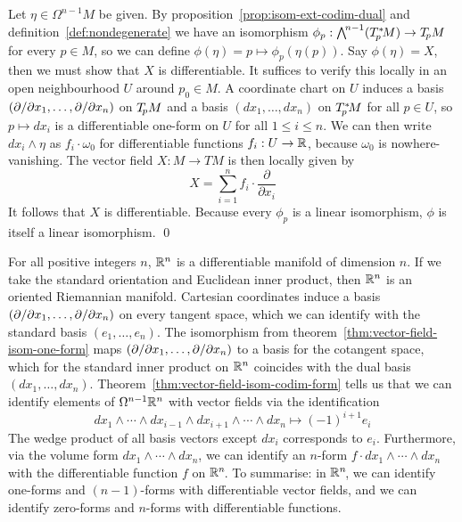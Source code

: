 \vspace{-\parskip}
\proof
Let $\eta \in \Omega^{n-1} M$ be given.
By proposition~\ref{prop:isom-ext-codim-dual}
and definition~\ref{def:nondegenerate}
we have an isomorphism $\phi_p : \L{n-1}(\Tps M) \to \Tp M$ for every $p \in M$,
so we can define $\phi(\eta) = p \mapsto \phi_p(\eta(p))$.
Say $\phi(\eta) = X$, then we must show that $X$ is differentiable.
It suffices to verify this locally in an open neighbourhood $U$ around $p_0 \in M$.
A coordinate chart on $U$ induces a basis $(\ppart x_1, \ldots, \ppart x_n)$ on $\Tp M$
and a basis $(dx_1, \ldots, dx_n)$ on $\Tps M$ for all $p \in U$,
so $p \mapsto dx_i$ is a differentiable one-form on $U$ for all $1 \leq i \leq n$.
We can then write $dx_i \wedge \eta$ as $f_i \cdot \omega_0$
for differentiable functions $f_i : U \to \R$,
because $\omega_0$ is nowhere-vanishing.
The vector field $X : M \to TM$ is then locally given by
\[ X = \sum_{i = 1}^n f_i \cdot \frac{\partial}{\partial x_i} \]
It follows that $X$ is differentiable.
Because every $\phi_p$ is a linear isomorphism,
$\phi$ is itself a linear isomorphism.
\qed

\example[ex:r3-manifold]
For all positive integers $n$,
$\R^n$ is a differentiable manifold of dimension $n$.
If we take the standard orientation and Euclidean inner product,
then $\R^n$ is an oriented Riemannian manifold.
Cartesian coordinates induce a basis
$(\ppart x_1, \ldots, \ppart x_n)$ on every tangent space,
which we can identify with the standard basis $(e_1, \ldots, e_n)$.
The isomorphism from theorem~\ref{thm:vector-field-isom-one-form}
maps $(\ppart x_1, \ldots, \ppart x_n)$ to a basis for the cotangent space,
which for the standard inner product on $\R^n$
coincides with the dual basis $(dx_1, \ldots, dx_n)$.
Theorem~\ref{thm:vector-field-isom-codim-form} tells us that we can identify
elements of $\Omega^{n-1} \R^n$ with vector fields via the identification
\[ dx_1 \wedge \cdots \wedge dx_{i - 1} \wedge dx_{i + 1} \wedge \cdots \wedge dx_n
\longmapsto (-1)^{i + 1} e_i \]
The wedge product of all basis vectors except $dx_i$ corresponds to $e_i$.
Furthermore, via the volume form $dx_1 \wedge \cdots \wedge dx_n$,
we can identify an $n$-form $f \cdot dx_1 \wedge \cdots \wedge dx_n$
with the differentiable function $f$ on $\R^n\!$.
To summarise:
in $\R^n\!$, we can identify one-forms and $(n-1)$-forms with differentiable vector fields,
and we can identify zero-forms and $n$-forms with differentiable functions.

